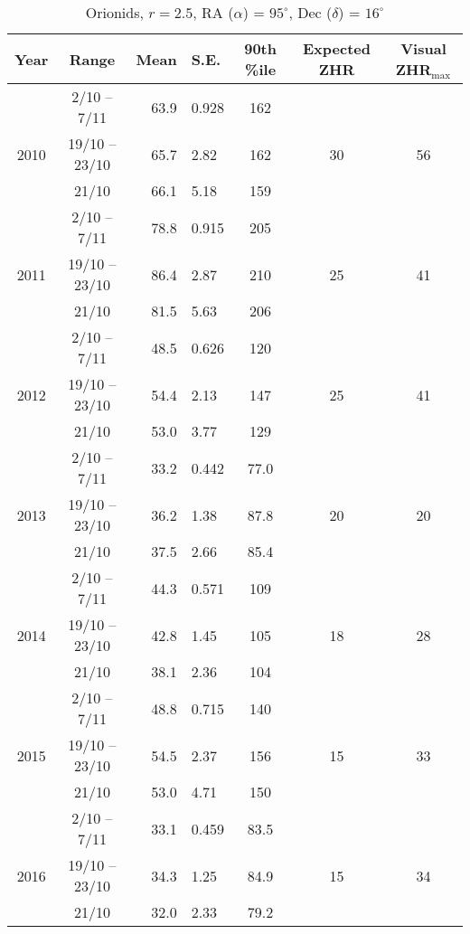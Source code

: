 \begin{table}[h!]
	\centering
	\begin{tabular}{|c|c|r@{ \,$\pm$\, }lc|cc|}
		\hline 
		Year & Range & Mean & S.E. & 90th \%ile & Expected ZHR & Visual ZHR$_{\text{max}}$ \\ 
		\hline
		& 2/10 -- 7/11 & 63.9 & 0.928 & 162 & &  \\ 
		2010 & 19/10 -- 23/10&	65.7 & 2.82 & 162 & 30 & 56  \\ 
		& 21/10& 66.1 & 5.18 & 159  & & \\ 
		\hline 
		& 2/10 -- 7/11& 78.8 & 0.915 & 205  & & \\ 
		2011 & 19/10 -- 23/10& 86.4 & 2.87 & 210 &25 & 41  \\ 
		& 21/10& 81.5 & 5.63 & 206  & & \\ 
		\hline 
		& 2/10 -- 7/11& 48.5 & 0.626 & 120  & & \\
		2012 & 19/10 -- 23/10& 54.4 & 2.13 & 147 & 25 & 41  \\ 
		& 21/10& 53.0 & 3.77 & 129  & & \\ 
		\hline 
		& 2/10 -- 7/11& 33.2 & 0.442 & 77.0 & &  \\ 
		2013 &19/10 -- 23/10 & 36.2 & 1.38 & 87.8 & 20 & 20 \\ 
		& 21/10& 37.5 & 2.66 & 85.4 & &  \\ 
		\hline 
		& 2/10 -- 7/11& 44.3 & 0.571 & 109 & &  \\ 
		2014 & 19/10 -- 23/10& 42.8 & 1.45 & 105 &18 & 28   \\ 
		& 21/10& 38.1 & 2.36 & 104 & & \\ 
		\hline 
		& 2/10 -- 7/11& 48.8 & 0.715 & 140 & &  \\ 
		2015 & 19/10 -- 23/10& 54.5 & 2.37 & 156 & 15 & 33  \\ 
		& 21/10& 53.0 & 4.71 & 150 & &  \\ 
		\hline
		& 2/10 -- 7/11& 33.1 & 0.459 & 83.5 & &	\\
		2016 & 19/10 -- 23/10 & 34.3 & 1.25 & 84.9 & 15 & 34  \\ 
		& 21/10 & 32.0 & 2.33 & 79.2 & &  \\ 
		\hline 
	\end{tabular}
	\caption{Orionids, $r=2.5$, RA ($\alpha$) = $95^{\circ}$, Dec ($\delta$) = $16^{\circ}$} 
\end{table}

